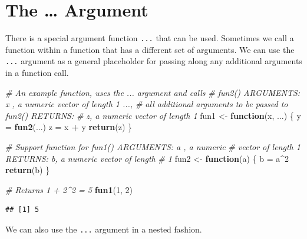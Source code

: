 \documentclass[
]{book}
\newenvironment{Shaded}{\begin{snugshade}}{\end{snugshade}}
\newcommand{\CommentTok}[1]{\textcolor[rgb]{0.56,0.35,0.01}{\textit{#1}}}
\newcommand{\ControlFlowTok}[1]{\textcolor[rgb]{0.13,0.29,0.53}{\textbf{#1}}}
\newcommand{\DecValTok}[1]{\textcolor[rgb]{0.00,0.00,0.81}{#1}}
\newcommand{\KeywordTok}[1]{\textcolor[rgb]{0.13,0.29,0.53}{\textbf{#1}}}
\newcommand{\NormalTok}[1]{#1}
\newcommand{\OperatorTok}[1]{\textcolor[rgb]{0.81,0.36,0.00}{\textbf{#1}}}
\newcommand{\StringTok}[1]{\textcolor[rgb]{0.31,0.60,0.02}{#1}}
\begin{document}
\hypertarget{dots}{%
\section{The \ldots{} Argument}\label{dots}}

There is a special argument function \texttt{...} that can be used. Sometimes we call a function within a function that has a different set of arguments. We can use the \texttt{...} argument as a general placeholder for passing along any additional arguments in a function call.

\begin{Shaded}
\begin{Highlighting}[]
\CommentTok{# An example function, uses the ... argument and calls}
\CommentTok{# fun2() ARGUMENTS: x , a numeric vector of length 1 ...,}
\CommentTok{# all additional arguments to be passed to fun2() RETURNS:}
\CommentTok{# z, a numeric vector of length 1}
\NormalTok{fun1 <-}\StringTok{ }\ControlFlowTok{function}\NormalTok{(x, ...) \{}
\NormalTok{    y =}\StringTok{ }\KeywordTok{fun2}\NormalTok{(...)}
\NormalTok{    z =}\StringTok{ }\NormalTok{x }\OperatorTok{+}\StringTok{ }\NormalTok{y}
    \KeywordTok{return}\NormalTok{(z)}
\NormalTok{\}}

\CommentTok{# Support function for fun1() ARGUMENTS: a , a numeric}
\CommentTok{# vector of length 1 RETURNS: b, a numeric vector of length}
\CommentTok{# 1}
\NormalTok{fun2 <-}\StringTok{ }\ControlFlowTok{function}\NormalTok{(a) \{}
\NormalTok{    b =}\StringTok{ }\NormalTok{a}\OperatorTok{^}\DecValTok{2}
    \KeywordTok{return}\NormalTok{(b)}
\NormalTok{\}}

\CommentTok{# Returns 1 + 2^2 = 5}
\KeywordTok{fun1}\NormalTok{(}\DecValTok{1}\NormalTok{, }\DecValTok{2}\NormalTok{)}
\end{Highlighting}
\end{Shaded}

\begin{verbatim}
## [1] 5
\end{verbatim}

We can also use the \texttt{...} argument in a nested fashion.
\end{document}
